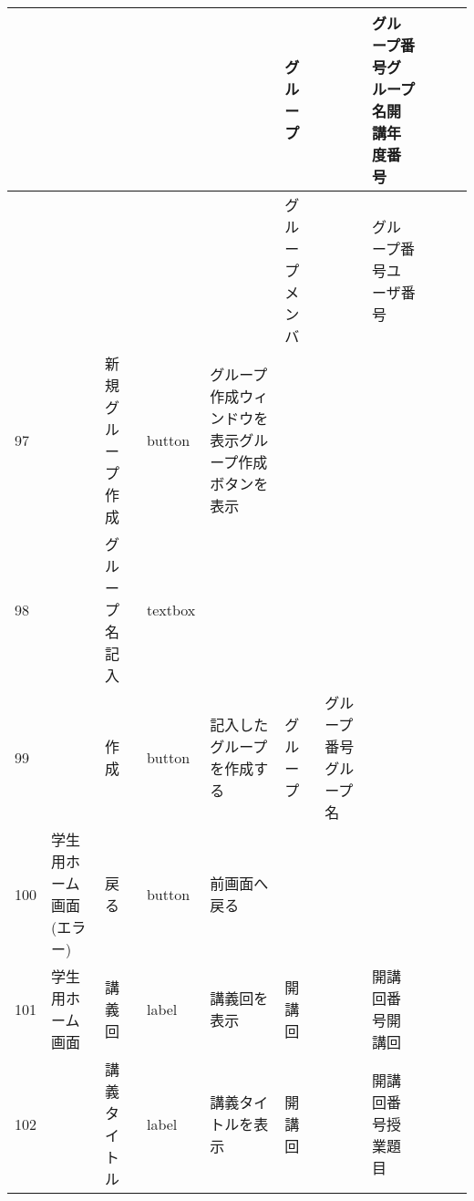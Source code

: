 \begin{table}[]
\begin{tabular}{|l|l|l|l|l|l|l|l|l|l|l|}
    &               &                  &          &                                                                   & グループ    &                       & グループ番号グループ名開講年度番号  &                 &                               &                                                                \\ \hline
    &               &                  &          &                                                                   & グループメンバ &                       & グループ番号ユーザ番号        &                 &                               &                                                                \\ \hline
97  &               & 新規グループ作成         & button   & グループ作成ウィンドウを表示グループ作成ボタンを表示                                        &         &                       &                    &                 &                               &                                                                \\ \hline
98  &               & グループ名記入          & textbox  &                                                                   &         &                       &                    &                 &                               &                                                                \\ \hline
99  &               & 作成               & button   & 記入したグループを作成する                                                     & グループ    & グループ番号グループ名           &                    &                 &                               &                                                                \\ \hline
100 & 学生用ホーム画面(エラー) & 戻る               & button   & 前画面へ戻る                                                            &         &                       &                    &                 &                               &                                                                \\ \hline
101 & 学生用ホーム画面      & 講義回              & label    & 講義回を表示                                                            & 開講回     &                       & 開講回番号開講回           &                 &                               &                                                                \\ \hline
102 &               & 講義タイトル           & label    & 講義タイトルを表示                                                         & 開講回     &                       & 開講回番号授業題目          &                 &                               &                                                                \\ \hline

\end{tabular}
\end{table}
